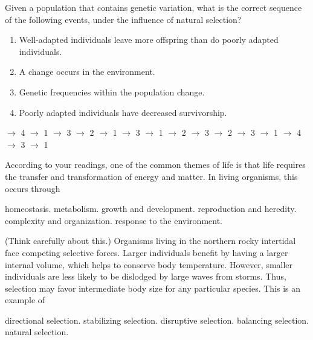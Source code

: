 \question
Given a population that contains genetic variation, what is the correct sequence of the following events, under the influence of natural selection?
\begin{enumerate}
	\item Well-adapted individuals leave more offspring than do poorly adapted individuals.
	\item A change occurs in the environment.
	\item Genetic frequencies within the population change.
	\item Poorly adapted individuals have decreased survivorship.
\end{enumerate}

\begin{choices}
 $\rightarrow$ 4 $\rightarrow$ 1 $\rightarrow$ 3 %
 $\rightarrow$ 2 $\rightarrow$ 1 $\rightarrow$ 3 %
 $\rightarrow$ 1 $\rightarrow$ 2 $\rightarrow$ 3 %
 $\rightarrow$ 2 $\rightarrow$ 3 $\rightarrow$ 1 %
 $\rightarrow$ 4 $\rightarrow$ 3 $\rightarrow$ 1 %
\end{choices}




\question
According to your readings, one of the common themes of life is that life requires the transfer and transformation of energy and matter.  In living organisms, this occurs through

\begin{choices}
\choice homeostasis. %
\correctchoice metabolism. %
\choice growth and development. %
\choice reproduction and heredity. %
\choice complexity and organization. %
\choice response to the environment. %
\end{choices}

\question
(Think carefully about this.) Organisms living in the northern rocky intertidal face competing selective forces. Larger individuals benefit by having a larger internal volume, which helps to conserve body temperature. However, smaller individuals are less likely to be dislodged by large waves from storms. Thus, selection may favor intermediate body size for any particular species. This is an example of

\begin{choices}
\choice directional selection. %
\choice stabilizing selection. %
\choice disruptive selection. %
\correctchoice balancing selection. %
\choice natural selection. %
\end{choices}

